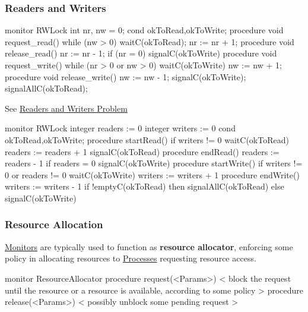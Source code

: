 \subsubsection{Readers and Writers}\label{sub:pi_mn_readers_and_writers} %
\begin{codeblock}{}
    monitor RWLock {
        int nr, nw = 0;
        cond okToRead,okToWrite;
        procedure void request_read(){
            while (nw > 0)
            waitC(okToRead);
            nr := nr + 1;
        }
        procedure void release_read(){
            nr := nr - 1;
            if (nr = 0)
            signalC(okToWrite)
        }
        procedure void request_write(){
            while (nr > 0 or nw > 0)
            waitC(okToWrite)
            nw := nw + 1;
        }
        procedure void release_write(){
            nw := nw - 1;
            signalC(okToWrite);
            signalAllC(okToRead);
        }
    }
\end{codeblock}
\begin{note}
    See \hyperref[sub:pi_readers_and_writers_problem]{Readers and Writers Problem}
\end{note}
\begin{remark}{}{}
    \begin{codeblock}{}
    monitor RWLock {
        integer readers := 0
        integer writers := 0
        cond okToRead,okToWrite;
        procedure startRead(){
            if writers != 0
            waitC(okToRead)
            readers := readers + 1
            signalC(okToRead)
        }
        procedure endRead(){
            readers := readers - 1
            if readers = 0
            signalC(okToWrite)
        }
        procedure startWrite(){
            if writers != 0 or readers != 0
            waitC(okToWrite)
            writers := writers + 1
        }
        procedure endWrite(){
            writers := writers - 1
            if !emptyC(okToRead)
            then signalAllC(okToRead)
            else signalC(okToWrite)
        }
    }
    \end{codeblock}
\end{remark}
%
\subsubsection{Resource Allocation}\label{sub:pi_resource_allocation} %
\hyperref[def:monitor]{Monitors} are typically used to function as \textbf{resource allocator}, enforcing some policy in allocating resources to \hyperref[def:process]{Processes} requesting resource access.
\begin{codeblock}{}
    monitor ResourceAllocator {
        procedure request(<Params>){
            < block the request
            until the resource or a resource
            is available, according to some policy >
        }
        procedure release(<Params>){
            < possibly unblock some pending request >
        }
    }
\end{codeblock}
%
